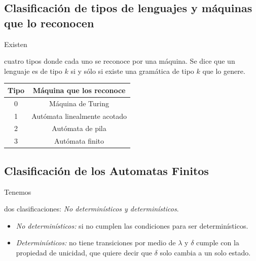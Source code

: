 \documentclass[stu, 12pt, letterpaper, donotrepeattitle, floatsintext, natbib]{apa7}
\begin{document}
\subsection{Clasificación de tipos de lenguajes y máquinas que lo reconocen}
Existen \begin{justifying}
    cuatro tipos donde cada uno se reconoce por una máquina. Se dice que un lenguaje es de tipo \(k\) si y sólo si existe una gramática de
    tipo \(k\) que lo genere.\par
 \end{justifying}
 \begin{table}[]
    \centering
    \begin{tabular}{cc}
    \hline
    \textbf{Tipo} & \textbf{Máquina que los reconoce} \\ \hline
    0             & Máquina de Turing                 \\
    1             & Autómata linealmente acotado      \\
    2             & Autómata de pila                  \\
    3             & Autómata finito                   \\ \hline         
    \end{tabular}
    \end{table}
\subsection{Clasificación de los Automatas Finitos}
Tenemos \begin{justifying}
    dos clasificaciones: \emph{No determinísticos y determinísticos}.\par
\end{justifying}
\begin{justifying}
    \begin{itemize}
        \item \emph{No determinísticos:} si no cumplen las condiciones para ser determinísticos.
        \item \emph{Determinísticos:} no tiene transiciones por medio de \(\lambda\) y \(\delta\) cumple con la propiedad de unicidad, que quiere decir que \(\delta\) solo cambia a un solo estado.
    \end{itemize}\par    
\end{justifying}
\end{document}
